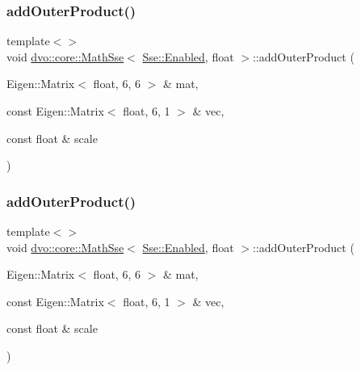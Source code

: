 \mbox{\label{classdvo_1_1core_1_1_math_sse_a5d8a137703df78832e1cfb591b290cb0}} 
\subsubsection{\texorpdfstring{add\+Outer\+Product()}{addOuterProduct()}\hspace{0.1cm}{\footnotesize\ttfamily [2/5]}}
{\footnotesize\ttfamily template$<$$>$ \\
void \mbox{\hyperlink{classdvo_1_1core_1_1_math_sse}{dvo\+::core\+::\+Math\+Sse}}$<$ \mbox{\hyperlink{structdvo_1_1core_1_1_sse_a4fd9b55a1ec035f837cc78f33d45a9adadefbacd4d80d2e8ba64c1583a4fda95a}{Sse\+::\+Enabled}}, float $>$\+::add\+Outer\+Product (\begin{DoxyParamCaption}\item[{Eigen\+::\+Matrix$<$ float, 6, 6 $>$ \&}]{mat,  }\item[{const Eigen\+::\+Matrix$<$ float, 6, 1 $>$ \&}]{vec,  }\item[{const float \&}]{scale }\end{DoxyParamCaption})}

\mbox{\label{classdvo_1_1core_1_1_math_sse_a5d8a137703df78832e1cfb591b290cb0}} 
\subsubsection{\texorpdfstring{add\+Outer\+Product()}{addOuterProduct()}\hspace{0.1cm}{\footnotesize\ttfamily [3/5]}}
{\footnotesize\ttfamily template$<$$>$ \\
void \mbox{\hyperlink{classdvo_1_1core_1_1_math_sse}{dvo\+::core\+::\+Math\+Sse}}$<$ \mbox{\hyperlink{structdvo_1_1core_1_1_sse_a4fd9b55a1ec035f837cc78f33d45a9adadefbacd4d80d2e8ba64c1583a4fda95a}{Sse\+::\+Enabled}}, float $>$\+::add\+Outer\+Product (\begin{DoxyParamCaption}\item[{Eigen\+::\+Matrix$<$ float, 6, 6 $>$ \&}]{mat,  }\item[{const Eigen\+::\+Matrix$<$ float, 6, 1 $>$ \&}]{vec,  }\item[{const float \&}]{scale }\end{DoxyParamCaption})}

